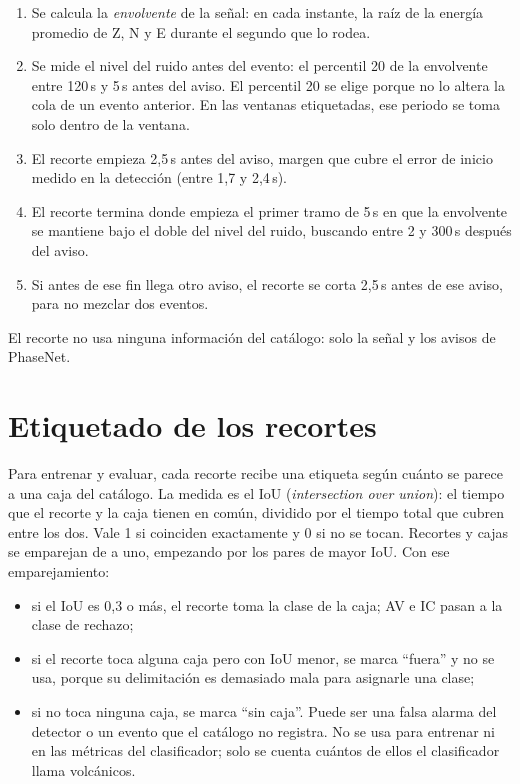 \begin{enumerate}
\item Se calcula la \emph{envolvente} de la señal: en cada instante, la raíz
  de la energía promedio de Z, N y E durante el segundo que lo rodea.
\item Se mide el nivel del ruido antes del evento: el percentil 20 de la
  envolvente entre 120\,s y 5\,s antes del aviso. El percentil 20 se elige
  porque no lo altera la cola de un evento anterior. En las ventanas
  etiquetadas, ese periodo se toma solo dentro de la ventana.
\item El recorte empieza 2,5\,s antes del aviso, margen que cubre el error de
  inicio medido en la detección (entre 1,7 y 2,4\,s).
\item El recorte termina donde empieza el primer tramo de 5\,s en que la
  envolvente se mantiene bajo el doble del nivel del ruido, buscando entre 2 y
  300\,s después del aviso.
\item Si antes de ese fin llega otro aviso, el recorte se corta 2,5\,s antes
  de ese aviso, para no mezclar dos eventos.
\end{enumerate}

El recorte no usa ninguna información del catálogo: solo la señal y los
avisos de PhaseNet.

\section{Etiquetado de los recortes}
\label{sec:etiquetado}

Para entrenar y evaluar, cada recorte recibe una etiqueta según cuánto se
parece a una caja del catálogo. La medida es el IoU (\emph{intersection over
union}): el tiempo que el recorte y la caja tienen en común, dividido por el
tiempo total que cubren entre los dos. Vale 1 si coinciden exactamente y 0 si
no se tocan. Recortes y cajas se emparejan de a uno, empezando por los pares
de mayor IoU. Con ese emparejamiento:

\begin{itemize}
\item si el IoU es 0,3 o más, el recorte toma la clase de la caja; AV e IC
  pasan a la clase de rechazo;
\item si el recorte toca alguna caja pero con IoU menor, se marca ``fuera'' y
  no se usa, porque su delimitación es demasiado mala para asignarle una
  clase;
\item si no toca ninguna caja, se marca ``sin caja''. Puede ser una falsa
  alarma del detector o un evento que el catálogo no registra. No se usa para
  entrenar ni en las métricas del clasificador; solo se cuenta cuántos de ellos
  el clasificador llama volcánicos.
\end{itemize}

